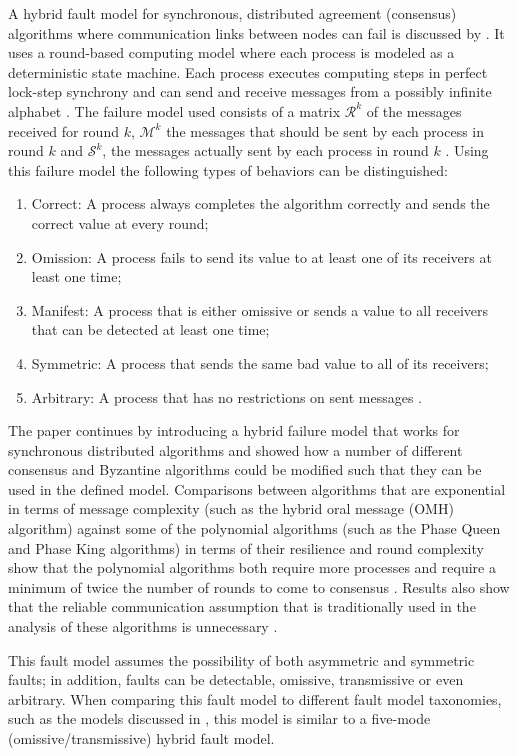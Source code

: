 \documentclass[twoside, conference]{IEEEtran}%
\begin{document}
A hybrid fault model for synchronous, distributed agreement (consensus) algorithms where communication links between nodes can fail is discussed by \cite{Biely2011}.  It uses a round-based computing model where each process is modeled as a deterministic state machine.  Each process executes computing steps in perfect lock-step synchrony and can send and receive messages from a possibly infinite alphabet \cite{Biely2011}.  The failure model used consists of a matrix $\mathcal{R}^k$ of the messages received for round $k$, $\mathcal{M}^k$ the messages that should be sent by each process in round $k$ and $\mathcal{S}^k$, the messages actually sent by each process in round $k$ \cite{Biely2011}.  Using this failure model the following types of behaviors can be distinguished:
\begin{enumerate}
	\item Correct: A process always completes the algorithm correctly and sends the correct value at every round;
	\item Omission: A process fails to send its value to at least one of its receivers at least one time;
	\item Manifest: A process that is either omissive or sends a value to all receivers that can be detected at least one time;
	\item Symmetric: A process that sends the same bad value to all of its receivers;
	\item Arbitrary: A process that has no restrictions on sent messages \cite{Biely2011}.
\end{enumerate}
The paper continues by introducing a hybrid failure model that works for synchronous distributed algorithms \cite{Biely2011} and showed how a number of different consensus and Byzantine algorithms could be modified such that they can be used in the defined model.  Comparisons between algorithms that are exponential in terms of message complexity (such as the hybrid oral message (OMH) algorithm) against some of the polynomial algorithms (such as the Phase Queen and Phase King algorithms) in terms of their resilience and round complexity show that the polynomial algorithms both require more processes and require a minimum of twice the number of rounds to come to consensus \cite{Biely2011}.  Results also show that the reliable communication assumption that is traditionally used in the analysis of these algorithms is unnecessary \cite{Biely2011}.

This fault model assumes the possibility of both asymmetric and symmetric faults; in addition, faults can be detectable, omissive, transmissive or even arbitrary.  When comparing this fault model to different fault model taxonomies, such as the models discussed in \cite{Azadmanesh2000}, this model is similar to a five-mode (omissive/transmissive) hybrid fault model.
\end{document}
